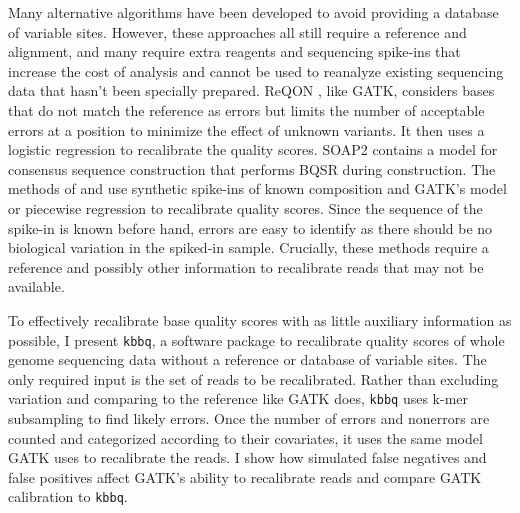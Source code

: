 Many alternative algorithms have been developed to avoid providing a database of variable sites. However, these approaches all still require a reference and alignment, and many require extra reagents and sequencing spike-ins that increase the cost of analysis and cannot be used to reanalyze existing sequencing data that hasn't been specially prepared.
ReQON \parencite{cabanski_reqon:_2012}, like GATK, considers bases that do not match the reference as errors but limits the number of acceptable errors at a position to minimize the effect of unknown variants. It then uses a logistic regression to recalibrate the quality scores.
SOAP2 \parencite{li_soap2:_2009} contains a model for consensus sequence construction that performs BQSR during construction. %
The methods of \cite{zook_synthetic_2012} and \cite{ni_improvement_2016} use synthetic spike-ins of known composition and GATK's model \parencite{zook_synthetic_2012} or piecewise regression \parencite{ni_improvement_2016} to recalibrate quality scores. Since the sequence of the spike-in is known before hand, errors are easy to identify as there should be no biological variation in the spiked-in sample.
Crucially, these methods require a reference and possibly other information to recalibrate reads that may not be available.

To effectively recalibrate base quality scores with as little auxiliary information as possible, I present \texttt{kbbq}, a software package to recalibrate quality scores of whole genome sequencing data without a reference or database of variable sites. The only required input is the set of reads to be recalibrated. Rather than excluding variation and comparing to the reference like GATK does, \texttt{kbbq} uses k-mer subsampling to find likely errors. Once the number of errors and nonerrors are counted and categorized according to their covariates, it uses the same model GATK uses to recalibrate the reads. I show how simulated false negatives and false positives affect GATK's ability to recalibrate reads and compare GATK calibration to \texttt{kbbq}.
